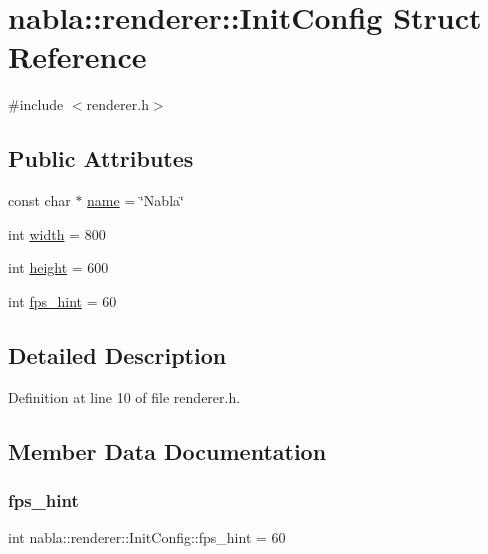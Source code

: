 \hypertarget{structnabla_1_1renderer_1_1_init_config}{}\section{nabla\+::renderer\+::Init\+Config Struct Reference}
\label{structnabla_1_1renderer_1_1_init_config}


{\ttfamily \#include $<$renderer.\+h$>$}

\subsection*{Public Attributes}
\begin{DoxyCompactItemize}
\item 
const char $\ast$ \mbox{\hyperlink{structnabla_1_1renderer_1_1_init_config_a287d9aafaf6a59688754aad2742e4860}{name}} = \char`\"{}Nabla\char`\"{}
\item 
int \mbox{\hyperlink{structnabla_1_1renderer_1_1_init_config_ac9ec130f38b0baec8c4df6dcaaf40265}{width}} = 800
\item 
int \mbox{\hyperlink{structnabla_1_1renderer_1_1_init_config_a334c731062f3de409f333b9115d5f125}{height}} = 600
\item 
int \mbox{\hyperlink{structnabla_1_1renderer_1_1_init_config_af54576ed84d4ff3e6d32260f0fb7ddd5}{fps\+\_\+hint}} = 60
\end{DoxyCompactItemize}


\subsection{Detailed Description}


Definition at line 10 of file renderer.\+h.



\subsection{Member Data Documentation}
\mbox{\label{structnabla_1_1renderer_1_1_init_config_af54576ed84d4ff3e6d32260f0fb7ddd5}} 
\subsubsection{\texorpdfstring{fps\_hint}{fps\_hint}}
{\footnotesize\ttfamily int nabla\+::renderer\+::\+Init\+Config\+::fps\+\_\+hint = 60}



